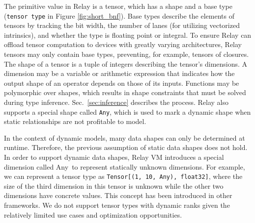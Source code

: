 The primitive value in Relay is a tensor, which has
  a shape and a base type (\verb|tensor type| in Figure \ref{fig:short_bnf}).
Base types describe the elements of tensors by tracking
  the bit width,
  the number of lanes (for utilizing vectorized intrinsics),
  and whether the type is floating point or integral.
To ensure Relay can offload tensor computation to devices
  with greatly varying architectures,
  Relay tensors may only contain base types,
  preventing, for example, tensors of closures.
The shape of a tensor is a tuple of integers describing the tensor's dimensions.
A dimension may be a variable or arithmetic expression that indicates how the
  output shape of an operator depends on those of its inputs.
Functions may be polymorphic over shapes, which results
  in shape constraints that must be solved during type inference.
Sec.~\ref{sec:inference} describes the process.
Relay also supports a special shape called \verb|Any|, which is used
  to mark a dynamic shape when static relationships are not profitable
  to model.

In the context of dynamic models, many data shapes can only be determined at runtime.
Therefore, the previous assumption of static data shapes does not hold.
In order to support dynamic data shapes, Relay VM introduces a special dimension called
  Any~to represent statically unknown dimensions.
For example, we can represent a tensor type as \texttt{Tensor[(1, 10, Any), float32]},
  where the size of the third dimension in this tensor is unknown while the other
  two dimensions have concrete values.
This concept has been introduced in other frameworks.
We do not support tensor types with dynamic ranks given the relatively limited use cases and optimization opportunities.



